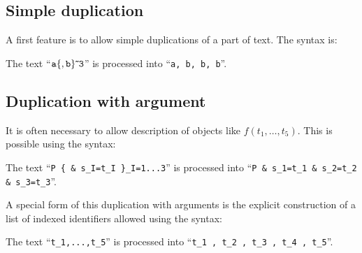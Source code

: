  {
\gror
        \sym{(}\sym{)}
}

 {
\gror
         \sym{+} 
\gror
         \sym{-} 
\gror
         \sym{*} 
\gror
         \sym{/} 
\gror
         \sym{\%} 
\gror
        \sym{(}\sym{)}
}



\subsection{Simple duplication}

A first feature is to allow simple duplications of a part of text. The
syntax is:

 {
  \symmm{$\tilde{\ }$}
\gror
  \sym{\{}  \sym{\}}\symmm{$\tilde{\ }$}
}

\EX
The text ``$\tt a\{, b\}\tilde{\ }3$'' is processed into ``{\tt a, b,
b, b}''. 
\FEX

\subsection{Duplication with argument}

It is often necessary to allow description of objects like
$f(t_1,\ldots,t_5)$. This is possible using the syntax:



\EX
The text ``{\tt P \{ \& s\_I=t\_I \}\_I=1...3}'' is processed into
``{\tt P  \& s\_1=t\_1 \& s\_2=t\_2  \& s\_3=t\_3}''. 
\FEX

A special form of this duplication with arguments is the explicit
construction of a list of indexed identifiers allowed using the
syntax:


\EX
The text ``{\tt t\_1,...,t\_5}'' is processed into ``{\tt t\_1 , t\_2
, t\_3 , t\_4 , t\_5}''. 
\FEX

